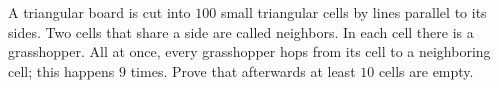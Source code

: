 A triangular board is cut into $100$ small triangular cells by lines parallel to its sides. Two cells that share a side are called neighbors. In each cell there is a grasshopper. All at once, every grasshopper hops from its cell to a neighboring cell; this happens $9$ times. Prove that afterwards at least $10$ cells are empty.
